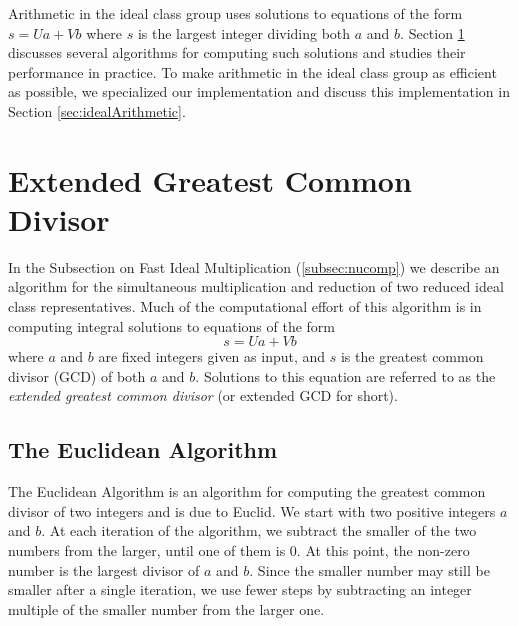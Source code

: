 \documentclass{ucalgthes1}
\theoremstyle{definition}
\begin{document}
Arithmetic in the ideal class group uses solutions to equations of the form $s = Ua + Vb$ where $s$ is the largest integer dividing both $a$ and $b$. Section \ref{sec:eea} discusses several algorithms for computing such solutions and studies their performance in practice. To make arithmetic in the ideal class group as efficient as possible, we specialized our implementation and discuss this implementation in Section \ref{sec:idealArithmetic}.


\section{Extended Greatest Common Divisor}
\label{sec:eea}

In the Subsection on Fast Ideal Multiplication (\ref{subsec:nucomp}) we describe an algorithm for the simultaneous multiplication and reduction of two reduced ideal class representatives.  Much of the computational effort of this algorithm is in computing integral solutions to equations of the form
\[
	s = Ua + Vb
\]
where $a$ and $b$ are fixed integers given as input, and $s$ is the greatest common divisor (GCD) of both $a$ and $b$.  Solutions to this equation are referred to as the \emph{extended greatest common divisor} (or extended GCD for short).

\subsection{The Euclidean Algorithm}
\label{subsec:euclideanAlgorithm}

The Euclidean Algorithm is an algorithm for computing the greatest common divisor of two integers and is due to Euclid.  We start with two positive integers $a$ and $b$.  At each iteration of the algorithm, we subtract the smaller of the two numbers from the larger, until one of them is 0. At this point, the non-zero number is the largest divisor of $a$ and $b$.  Since the smaller number may still be smaller after a single iteration, we use fewer steps by subtracting an integer multiple of the smaller number from the larger one.
\end{document}
